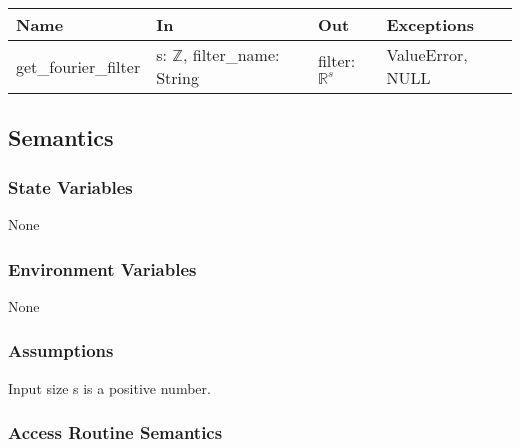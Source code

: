 \documentclass[12pt, titlepage]{article}
\begin{document}
\begin{center}
\begin{tabular}{|l|l|l|l|}
\hline
\textbf{Name} & \textbf{In} & \textbf{Out} & \textbf{Exceptions} \\
\hline
get\_fourier\_filter & s: \(\mathbb{Z}\), filter\_name: String & filter: \(\mathbb{R}^{s}\)  & ValueError, NULL \\
\hline
\end{tabular}
\end{center}

\subsection{Semantics}

\subsubsection{State Variables}
None

\subsubsection{Environment Variables}
None

\subsubsection{Assumptions}
Input size s is a positive number.

\subsubsection{Access Routine Semantics}
\end{document}
